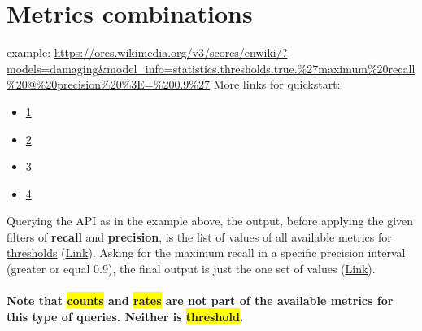 \documentclass[12pt,a4paper]{article}
\begin{document}
\section{Metrics combinations}
example: \url{https://ores.wikimedia.org/v3/scores/enwiki/?models=damaging&model_info=statistics.thresholds.true.%27maximum%20recall%20@%20precision%20%3E=%200.9%27}
More links for quickstart:
\begin{itemize} %
\item \href{https://ores.wikimedia.org/v3/scores/enwiki/?models=damaging&model_info=statistics.thresholds.true}{1}
\item \href{https://upload.wikimedia.org/wikipedia/commons/2/26/Precisionrecall.svg}{2}
\item \href{https://ores.wikimedia.org/v3/scores/enwiki/?models=damaging&model_info=statistics.thresholds.true.%27maximum%20!precision%20@%20precision%20%3E=%200.9%27}{3}
\item \href{https://ores.wikimedia.org/v3/scores/enwiki/?models=damaging&model_info=statistics.thresholds.true.%27maximum%20filter_rate%20@%20recall%20%3E=%200.75%27}{4}
\end{itemize}
Querying the API as in the example above, the output, before applying the given filters of \textbf{recall} and \textbf{precision}, is the list of values of all available metrics for \underline{thresholds} (\href{https://ores.wikimedia.org/v3/scores/enwiki/?models=damaging&model_info=statistics.thresholds.true}{Link}).
Asking for the maximum recall in a specific precision interval (greater or equal 0.9), the final output is just the one set of values (\href{https://ores.wikimedia.org/v3/scores/enwiki/?models=damaging&model_info=statistics.thresholds.true.%27maximum%20recall%20@%20precision%20%3E=%200.9%27}{Link}).
\paragraph{Note that \colorbox{yellow}{counts} and \colorbox{yellow}{rates} are not part of the available metrics for this type of queries. Neither is \colorbox{yellow}{threshold}.}
%
%
%
\end{document}
